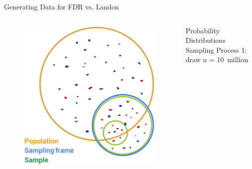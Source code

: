 \documentclass[aspectratio=169]{../latex_main/tntbeamer}  %
\begin{document}
	
		\begin{frame}{Generating Data for FDR vs. Landon}
	    \begin{columns}
	        \begin{column}{.4\textwidth}
	       
	           \begin{figure}
	               \includegraphics[scale=.37]{Bild13}
	           \end{figure}
	        \end{column}
	        
	        \begin{column}{.5\textwidth}
	           Probability Distributions\\
	           Sampling Process 1: draw n = 10~million


\end{column}
\end{columns}
\end{frame}
\end{document}
